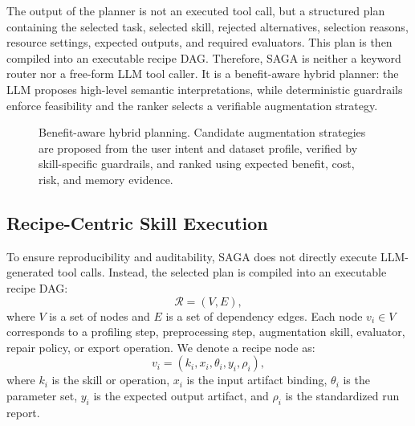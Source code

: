 The output of the planner is not an executed tool call, but a structured plan containing the selected task, selected skill, rejected alternatives, selection reasons, resource settings, expected outputs, and required evaluators.
This plan is then compiled into an executable recipe DAG.
Therefore, SAGA is neither a keyword router nor a free-form LLM tool caller.
It is a benefit-aware hybrid planner: the LLM proposes high-level semantic interpretations, while deterministic guardrails enforce feasibility and the ranker selects a verifiable augmentation strategy.

\begin{figure}[t]
    \centering
    \caption{Benefit-aware hybrid planning. Candidate augmentation strategies are proposed from the user intent and dataset profile, verified by skill-specific guardrails, and ranked using expected benefit, cost, risk, and memory evidence.}
    \label{fig:benefit_planning}
\end{figure}

\subsection{Recipe-Centric Skill Execution}
\label{subsec:recipe_execution}

To ensure reproducibility and auditability, SAGA does not directly execute LLM-generated tool calls.
Instead, the selected plan is compiled into an executable recipe DAG:
\begin{equation}
\mathcal{R}=(V,E),
\end{equation}
where $V$ is a set of nodes and $E$ is a set of dependency edges.
Each node $v_i \in V$ corresponds to a profiling step, preprocessing step, augmentation skill, evaluator, repair policy, or export operation.
We denote a recipe node as:
\begin{equation}
v_i = (k_i, x_i, \theta_i, y_i, \rho_i),
\end{equation}
where $k_i$ is the skill or operation, $x_i$ is the input artifact binding, $\theta_i$ is the parameter set, $y_i$ is the expected output artifact, and $\rho_i$ is the standardized run report.

